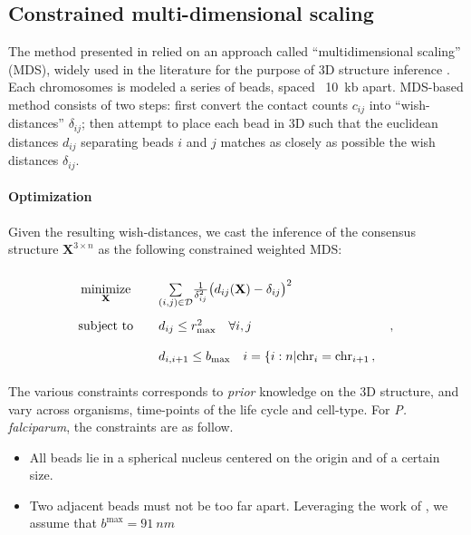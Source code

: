 \documentclass[letterpaper,12pt]{article}
\begin{document}
\subsection{Constrained multi-dimensional scaling}

The method presented in \citet{ay:three-dimensional} relied on an
approach called ``multidimensional scaling'' (MDS), widely used in the
literature for the purpose of 3D structure inference
\citep{duan:three-dimensional, varoquaux:statistical, bau:, tanizawa:}. Each chromosomes is
modeled a series of beads, spaced ~10~kb apart. MDS-based method consists of
two steps: first convert the
contact counts $c_{ij}$ into ``wish-distances'' $\delta_{ij}$; then attempt
to place each bead in 3D such that the euclidean distances $d_{ij}$ separating
beads $i$ and $j$ matches as closely as possible the wish distances
$\delta_{ij}$.

\paragraph{Optimization}

Given the resulting wish-distances, we cast the inference of the consensus
structure $\mathbf{X}^{3 \times n}$ as the following constrained weighted MDS:


\begin{equation}\label{eq:mds1} 
\renewcommand{\arraystretch}{2} 
\begin{array}{ccll} 
\underset{\mathbf{X}}{\text{minimize}} & & 
\underset{(i,j) \in \mathcal{D}}{\sum} \frac{1}{\delta^2_{ij}}
\big(d_{ij}(\mathbf{X}) - \delta_{ij}\big)^2 & \\
\text{subject to} & & d_{ij} \leq r^2_\text{max} \quad \forall i, j &\,,\\
& & d_{i, i+1} \leq b_\text{max} \quad i = \{i:n|\text{chr}_i = \text{chr}_{i+1}\,,&\\ 
\end{array} 
\end{equation}

The various constraints corresponds to {\em prior} knowledge on the 3D
structure, and vary across organisms, time-points of the life cycle and
cell-type. For {\em P. falciparum}, the constraints are as follow.

\begin{itemize}
\item All beads lie in a spherical nucleus centered on the origin and of a
certain size.
\item Two adjacent beads must not be too far apart. Leveraging the work of
\citet{berger:high TOVERIFY}, we assume that $b^\text{max} = 91~nm$
\end{itemize}
\end{document}
